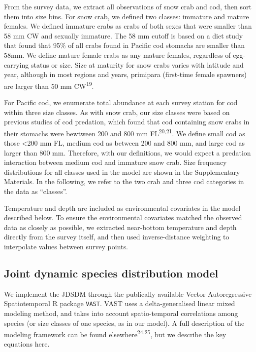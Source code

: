 \documentclass[11pt,]{article}
\begin{document}
From the survey data, we extract all observations of snow crab and cod, then sort them into size bins. For snow crab, we defined two classes: immature and mature females. We defined immature crabs as crabs of both sexes that were smaller than 58 mm CW and sexually immature. The 58 mm cutoff is based on a diet study that found that 95\% of all crabs found in Pacific cod stomachs are smaller than 58mm. We define mature female crabs as any mature females, regardless of egg-carrying status or size. Size at maturity for snow crabs varies with latitude and year, although in most regions and years, primipara (first-time female spawners) are larger than 50 mm CW\textsuperscript{19}.

For Pacific cod, we enumerate total abundance at each survey station for cod within three size classes. As with snow crab, our size classes were based on previous studies of cod predation, which found that cod containing snow crabs in their stomachs were bewtween 200 and 800 mm FL\textsuperscript{20,21}. We define small cod as those \textless{}200 mm FL, medium cod as between 200 and 800 mm, and large cod as larger than 800 mm. Therefore, with our definitions, we would expect a predation interaction between medium cod and immature snow crab. Size frequency distributions for all classes used in the model are shown in the Supplementary Materials. In the following, we refer to the two crab and three cod categories in the data as ``classes''.

Temperature and depth are included as environmental covariates in the model described below. To ensure the environmental covariates matched the observed data as closely as possible, we extracted near-bottom temperature and depth directly from the survey itself, and then used inverse-distance weighting to interpolate values between survey points.

\hypertarget{joint-dynamic-species-distribution-model}{%
\subsection{Joint dynamic species distribution model}\label{joint-dynamic-species-distribution-model}}

We implement the JDSDM through the publically available Vector Autoregressive Spatiotemporal R package \texttt{VAST}. VAST uses a delta-generalised linear mixed modeling method, and takes into account spatio-temporal correlations among species (or size classes of one species, as in our model). A full description of the modeling framework can be found elsewhere\textsuperscript{24,25}, but we describe the key equations here.
\end{document}
